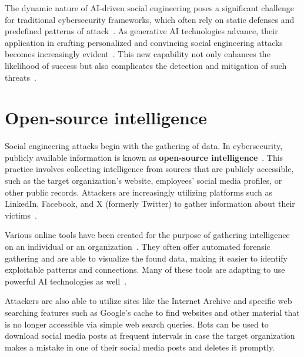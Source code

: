 %
%
The dynamic nature of AI-driven social engineering poses a significant challenge for traditional cybersecurity frameworks, which often rely on static defenses and predefined patterns of attack~\citep{fakhouri_AI_Driven_Solutions_SE_Attacks_2024}. As generative AI technologies advance, their application in crafting personalized and convincing social engineering attacks becomes increasingly evident~\citep{blauth_AI_Crime_Overview_Malicious_Use_Abuse_2022}. This new capability not only enhances the likelihood of success but also complicates the detection and mitigation of such threats~\citep{mirsky_Threat_Offensive_AI_Organizations_2023}.











\section{Open-source intelligence}

Social engineering attacks begin with the gathering of data. In cybersecurity, publicly available information is known as \textbf{open-source intelligence}~\citep{hadnagy_Social_Engineering_The_Science_2018}. This practice involves collecting intelligence from sources that are publicly accessible, such as the target organization's website, employees' social media profiles, or other public records. Attackers are increasingly utilizing platforms such as LinkedIn, Facebook, and X (formerly Twitter) to gather information about their victims~\citep{fakhouri_AI_Driven_Solutions_SE_Attacks_2024}.

Various online tools have been created for the purpose of gathering intelligence on an individual or an organization~\citep{mirsky_Threat_Offensive_AI_Organizations_2023}. They often offer automated forensic gathering and are able to visualize the found data, making it easier to identify exploitable patterns and connections. Many of these tools are adapting to use powerful AI technologies as well~\citep{wang_Defining_Social_Engineering_2020}.

Attackers are also able to utilize sites like the Internet Archive and specific web searching features such as Google’s cache to find websites and other material that is no longer accessible via simple web search queries. Bots can be used to download social media posts at frequent intervals in case the target organization makes a mistake in one of their social media posts and deletes it promptly.


